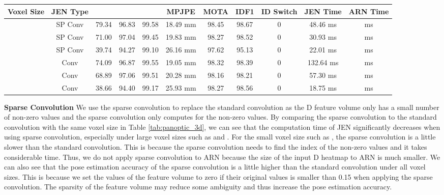 \begin{table*}[]
    \setlength{\tabcolsep}{7pt}
    \centering
    \begin{tabular}{cc|cccc|ccc|cc}
        \toprule
         Voxel Size & JEN Type &  &  &  & MPJPE & MOTA & IDF1 & ID Switch & JEN Time & ARN Time\\
         \midrule
          & SP Conv & 79.34 & 96.83 & 99.58 & 18.49 mm & 98.45 & 98.67 & 0 & 48.46 ms &  ms\\
          & SP Conv & 71.00 & 97.04 & 99.45 & 19.83 mm & 98.27 & 98.52 & 0 & 30.93 ms &  ms\\
          & SP Conv & 39.74 & 94.27 & 99.10 & 26.16 mm & 97.62 & 95.13 & 0 & 22.01 ms &  ms\\
          & Conv & 74.09 & 96.87 & 99.55 & 19.05 mm & 98.32 & 98.39 & 0 & 132.64 ms &  ms\\
          & Conv & 68.89 & 97.06 & 99.51 & 20.28 mm & 98.16 & 98.21 & 0 & 57.30 ms &  ms\\
          & Conv & 38.66 & 94.40 & 99.17 & 25.93 mm & 98.27 & 98.56 & 0 & 18.75 ms &  ms\\
         \bottomrule
    \end{tabular}
    \caption{Ablation study of voxel size and sparse convolution on the Panoptic dataset. }
    \label{tab:panoptic_3d}
\end{table*}

\vspace{0.5em}
\noindent
\textbf{Sparse Convolution} We use the sparse convolution to replace the standard convolution as the D feature volume only has a small number of non-zero values and the sparse convolution only computes for the non-zero values. By comparing the sparse convolution to the standard convolution with the same voxel size in Table \ref{tab:panoptic_3d}, we can see that the computation time of JEN significantly decreases when using sparse convolution, especially under large voxel sizes such as  and . For the small voxel size such as , the sparse convolution is a little slower than the standard convolution. This is because the sparse convolution needs to find the index of the non-zero values and it takes considerable time. Thus, we do not apply sparse convolution to ARN because the size of the input D heatmap to ARN is much smaller. We can also see that the pose estimation accuracy of the sparse convolution is a little higher than the standard convolution under all voxel sizes. This is because we set the values of the feature volume to zero if their original values is smaller than 0.15 when applying the sparse convolution. The sparsity of the feature volume may reduce some ambiguity and thus increase the pose estimation accuracy. 


